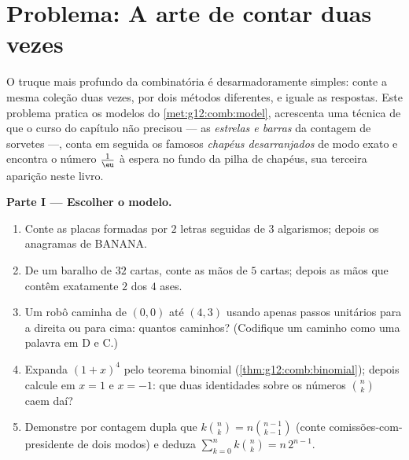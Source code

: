 \section{Problema: A arte de contar duas vezes}

\begin{problem}
\label{pb:g12:comb:1}
O truque mais profundo da combinatória é desarmadoramente simples:
conte a mesma coleção duas vezes, por dois métodos diferentes, e
iguale as respostas. Este problema pratica os modelos do
\cref{met:g12:comb:model}, acrescenta uma técnica de que o curso do
capítulo não precisou --- as \emph{estrelas e barras} da contagem
de sorvetes ---, conta em seguida os famosos \emph{chapéus
desarranjados} de modo exato e encontra o número $\frac1\eu$ à
espera no fundo da pilha de chapéus, sua terceira aparição neste
livro.

\medskip
\noindent\textbf{Parte I --- Escolher o modelo.}
\begin{enumerate}
  \item Conte as placas formadas por $2$ letras seguidas de $3$
        algarismos; depois os anagramas de BANANA.
  \item De um baralho de $32$ cartas, conte as mãos de $5$
        cartas; depois as mãos que contêm exatamente $2$ dos $4$
        ases.
  \item Um robô caminha de $(0,0)$ até $(4,3)$ usando apenas
        passos unitários para a direita ou para cima: quantos
        caminhos? (Codifique um caminho como uma palavra em D e
        C.)
  \item Expanda $(1 + x)^4$ pelo teorema binomial
        (\cref{thm:g12:comb:binomial}); depois calcule em
        $x = 1$ e $x = -1$: que duas identidades sobre os números
        $\binom nk$ caem daí?
  \item Demonstre por contagem dupla que
        $k\binom nk = n\binom{n-1}{k-1}$ (conte
        comissões-com-presidente de dois modos) e deduza
        $\sum_{k=0}^{n} k\binom nk = n\,2^{n-1}$.
\end{enumerate}


\end{problem}
